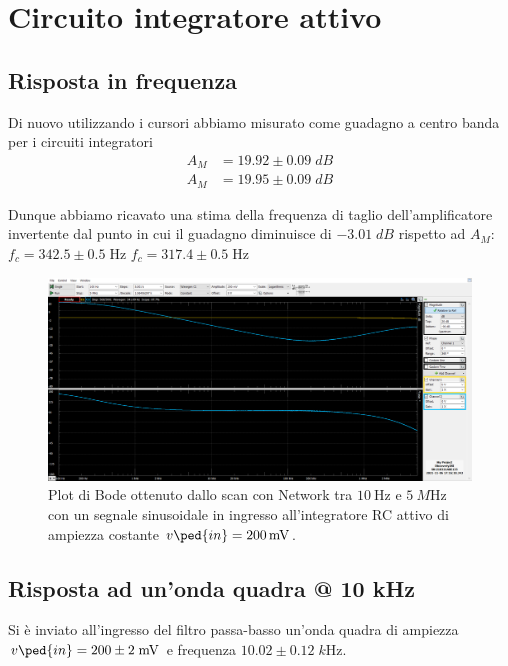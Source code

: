 \documentclass[10pt,a4paper]{article}
\begin{document}
\section{Circuito integratore attivo}
\subsection{Risposta in frequenza}
Di nuovo utilizzando i cursori abbiamo misurato come guadagno a centro banda
per i circuiti integratori
\begin{align*}
A_M &= 19.92 \pm 0.09 \; \si{dB} \\
A_M &= 19.95 \pm 0.09 \; \si{dB}
\end{align*}

Dunque abbiamo ricavato una stima della frequenza di taglio dell'amplificatore
invertente dal punto in cui il guadagno diminuisce di $-3.01 \; \si{dB}$
rispetto ad $A_M$:
$f_c = 342.5 \pm 0.5 \; \si{\Hz}$
$f_c = 317.4 \pm 0.5 \; \si{\Hz}$
\begin{figure}[htbp]
\centering
\includegraphics[scale=0.42]{bode integratore}
\caption{Plot di Bode ottenuto dallo scan con Network tra $\SI{10}{\Hz}$ e
$\SI{5}{M\Hz}$ con un segnale sinusoidale in ingresso all'integratore RC
attivo di ampiezza costante $v\ped{in} = \SI{200}{m\V}$.
\label{fig: intbode}}
\end{figure}

\subsection{Risposta ad un'onda quadra @ 10 kHz}
Si è inviato all'ingresso del filtro passa-basso un'onda quadra di
ampiezza $v\ped{in} = 200 \pm 2 \; \si{m\V}$ e frequenza
$10.02 \pm 0.12 \; \si{k\Hz}$.
\end{document}
